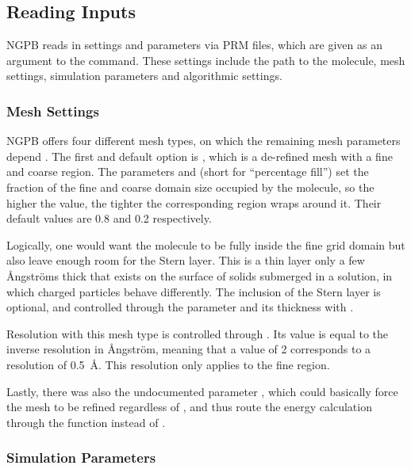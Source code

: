 \subsection{Reading Inputs}
\label{sec:nextgenpb-submodules-input}

NGPB reads in settings and parameters via PRM files, which are given as an argument to the  command.
These settings include the path to the molecule, mesh settings, simulation parameters and algorithmic settings.

\subsubsection{Mesh Settings}

NGPB offers four different mesh types, on which the remaining mesh parameters depend \cite{nextgenpb_docs}. 
The first and default option is , which is a de-refined mesh with a fine and coarse region.
The parameters  and  (short for ``percentage fill'') set the fraction of the fine and coarse domain size occupied by the molecule, so the higher the value, the tighter the corresponding region wraps around it. 
Their default values are 0.8 and 0.2 respectively.

Logically, one would want the molecule to be fully inside the fine grid domain but also leave enough room for the Stern layer. This is a thin layer only a few Ångströms thick that exists on the surface of solids submerged in a solution, in which charged particles behave differently.
The inclusion of the Stern layer is optional, and controlled through the  parameter and its thickness with .

Resolution with this mesh type is controlled through . Its value is equal to the inverse resolution in Ångström, meaning that a value of 2 corresponds to a resolution of 0.5 \,\AA{}. This resolution only applies to the fine region.

Lastly, there was also the undocumented parameter , which could basically force the mesh to be refined regardless of , and thus route the energy calculation through the  function instead of .

\subsubsection{Simulation Parameters}

